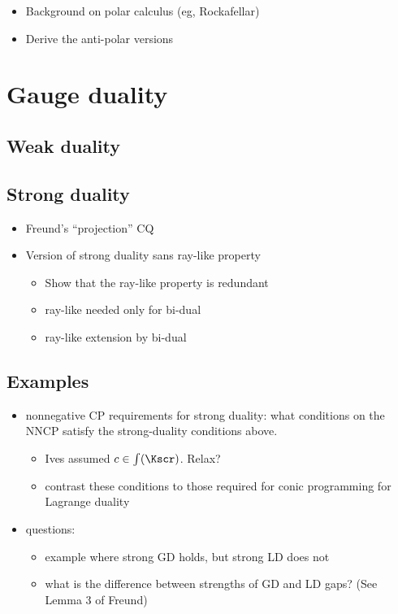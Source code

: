 \documentclass{siamltex}   %
\begin{document}
  \begin{itemize}
  \item Background on polar calculus (eg, Rockafellar)
  \item Derive the anti-polar versions
  \end{itemize}
  
  \section{Gauge duality}
  \label{sec:gauge-duality}

  \subsection{Weak duality}
  \label{sec:weak-duality}

  \subsection{Strong duality}
  \label{sec:strong-duality}
  
  \begin{itemize}
  \item Freund’s “projection” CQ
  \item Version of strong duality sans ray-like property
    \begin{itemize}
    \item Show that the ray-like property is redundant
    \item ray-like needed only for bi-dual
    \item ray-like extension by bi-dual
    \end{itemize}
  \end{itemize}

  \subsection{Examples}
  \begin{itemize}
  \item nonnegative CP requirements for strong duality: what
    conditions on the NNCP satisfy the strong-duality conditions
    above.
    \begin{itemize}
    \item Ives assumed $c \in \int(\Kscr)$. Relax?
    \item contrast these conditions to those required for conic
      programming for Lagrange duality
    \end{itemize}
  \item questions:
    \begin{itemize}
    \item example where strong GD holds, but strong LD does not
    \item what is the difference between strengths of GD and LD
      gaps? (See Lemma 3 of Freund)
    \end{itemize}
  \end{itemize}
\end{document}
